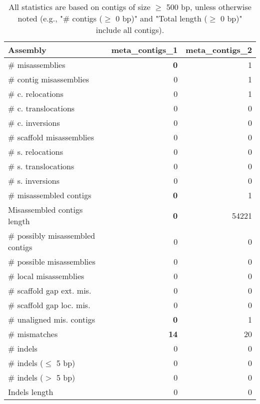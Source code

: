 \documentclass[12pt,a4paper]{article}
\begin{document}
\begin{table}[ht]
\begin{center}
\caption{All statistics are based on contigs of size $\geq$ 500 bp, unless otherwise noted (e.g., "\# contigs ($\geq$ 0 bp)" and "Total length ($\geq$ 0 bp)" include all contigs).}
\begin{tabular}{|l*{2}{|r}|}
\hline
Assembly & meta\_contigs\_1 & meta\_contigs\_2 \\ \hline
\# misassemblies & {\bf 0} & 1 \\ \hline
\hspace{2mm}\# contig misassemblies & 0 & 1 \\ \hline
\hspace{5mm}\# c. relocations & 0 & 1 \\ \hline
\hspace{5mm}\# c. translocations & 0 & 0 \\ \hline
\hspace{5mm}\# c. inversions & 0 & 0 \\ \hline
\hspace{2mm}\# scaffold misassemblies & 0 & 0 \\ \hline
\hspace{5mm}\# s. relocations & 0 & 0 \\ \hline
\hspace{5mm}\# s. translocations & 0 & 0 \\ \hline
\hspace{5mm}\# s. inversions & 0 & 0 \\ \hline
\# misassembled contigs & {\bf 0} & 1 \\ \hline
Misassembled contigs length & {\bf 0} & 54221 \\ \hline
\# possibly misassembled contigs & 0 & 0 \\ \hline
\hspace{5mm}\# possible misassemblies & 0 & 0 \\ \hline
\# local misassemblies & 0 & 0 \\ \hline
\# scaffold gap ext. mis. & 0 & 0 \\ \hline
\# scaffold gap loc. mis. & 0 & 0 \\ \hline
\# unaligned mis. contigs & {\bf 0} & 1 \\ \hline
\# mismatches & {\bf 14} & 20 \\ \hline
\# indels & 0 & 0 \\ \hline
\hspace{5mm}\# indels ($\leq$ 5 bp) & 0 & 0 \\ \hline
\hspace{5mm}\# indels ($>$ 5 bp) & 0 & 0 \\ \hline
Indels length & 0 & 0 \\ \hline
\end{tabular}
\end{center}
\end{table}
\end{document}
